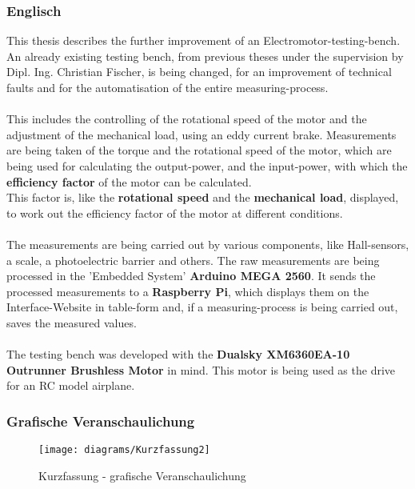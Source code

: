 \documentclass[12pt,a4paper]{article}
\begin{document}
\subsubsection{Englisch}
  This thesis describes the further improvement of an Electromotor-testing-bench.\\
  An already existing testing bench, from previous theses under the supervision by Dipl. Ing. Christian Fischer, 
  is being changed, for an improvement of technical faults and for the automatisation of the entire measuring-process.\\\\
  This includes the controlling of the rotational speed of the motor and the adjustment of the mechanical load, using an
  eddy current brake.
%
  Measurements are being taken of the torque and the rotational speed of the motor, which are being used for calculating
  the output-power, and the input-power, with which the {\bf efficiency factor} of the motor can be calculated. \\
  This factor is, like the {\bf rotational speed} and the {\bf mechanical load}, displayed, to work out the efficiency factor
  of the motor at different conditions. \\\\
%
  The measurements are being carried out by various components, like Hall-sensors, a scale, a photoelectric barrier and others.
  The raw measurements are being processed in the 'Embedded System' {\bf Arduino MEGA 2560}.
  It sends the processed measurements to a {\bf Raspberry Pi}, which displays them on the Interface-Website in table-form 
  and, if a measuring-process is being carried out, saves the measured values. \\\\
%
  The testing bench was developed with the {\bf Dualsky XM6360EA-10 Outrunner Brushless Motor} in mind.
  This motor is being used as the drive for an RC model airplane.
% 
\newpage
\subsubsection{Grafische Veranschaulichung}
\begin{figure}[h!]
\centering
\texttt{[image: diagrams/Kurzfassung2]}
\caption{Kurzfassung - grafische Veranschaulichung}
\end{figure}
%
%
\newpage
\end{document}
